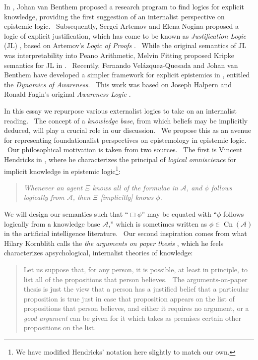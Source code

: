 \documentclass{acmconf}
\newcommand{\tmem}[1]{{\em #1\/}}
\newcommand{\tmop}[1]{\ensuremath{\operatorname{#1}}}
\newcommand{\tmtextit}[1]{{\itshape{#1}}}
\begin{document}
In {\cite{van_benthem_reflectionsepistemic_1991}}, Johan van Benthem proposed
a research program to find logics for explicit knowledge, providing the first
suggestion of an internalist perspective on epistemic logic. \ Subsequently,
Sergei Artemov and Elena Nogina proposed a logic of explicit justification,
which has come to be known as \tmtextit{Justification Logic} (JL)
{\cite{artemov_introducing_2005}}, based on Artemov's \tmtextit{Logic of
Proofs} {\cite{artemov_logic_1994}}. \ While the original semantics of JL was
interpretability into Peano Arithmetic, Melvin Fitting proposed Kripke
semantics for JL in {\cite{fitting_logic_2005}}. \ Recently, Fernando
Vel\'azquez-Quesada and Johan van Benthem have developed a simpler framework
for explicit epistemics in {\cite{van_benthem_inference_2009}}, entitled the
\tmtextit{Dynamics of Awareness}. \ This work was based on Joseph Halpern and
Ronald Fagin's original \tmtextit{Awareness Logic} {\cite{fagin_belief_1987}}.



In this essay we repurpose various externalist logics to take on an
internalist reading. \ The concept of a \tmtextit{knowledge base}, from which
beliefs may be implicitly deduced, will play a crucial role in our discussion.
\ We propose this as an avenue for representing foundationalist perspectives
on epistemology in epistemic logic. \ Our philosophical motivation is taken
from two sources. \ The first is Vincent Hendricks in
{\cite{hendricks_mainstream_2006}}, where he characterizes the principal of
{\tmem{logical omniscience}} for implicit knowledge in epistemic
logic{\footnote{We have modified Hendricks' notation here slightly to match
our own.}}:

\begin{quote}
  {\tmem{Whenever an agent $\Xi$ knows all of the formulae in $\mathcal{A}$,
  and $\phi$ follows logically from $\mathcal{A}$, then $\Xi$ [implicitly]
  knows $\phi$.}}
\end{quote}

We will design our semantics such that ``$\Box \phi$'' may be equated with
``$\phi$ follows logically from a knowledge base $\mathcal{A}$,'' which is
sometimes written as $\phi \in \tmop{Cn} ( \mathcal{A})$ in the artificial
intelligence literature. \ Our second inspiration comes from what Hilary
Kornblith calls the \tmtextit{the arguments on paper thesis}
{\cite{kornblith_beyond_1980}}, which he feels characterizes apsychological,
internalist theories of knowledge:

\begin{quote}
  Let us suppose that, for any person, it is possible, at least in principle,
  to list all of the propositions that person believes. \ The
  arguments-on-paper thesis is just the view that a person has a justified
  belief that a particular proposition is true just in case that proposition
  appears on the list of propositions that person believes, and either it
  requires no argument, or a {\tmem{good argument}} can be given for it which
  takes as premises certain other propositions on the list.
\end{quote}
\end{document}

